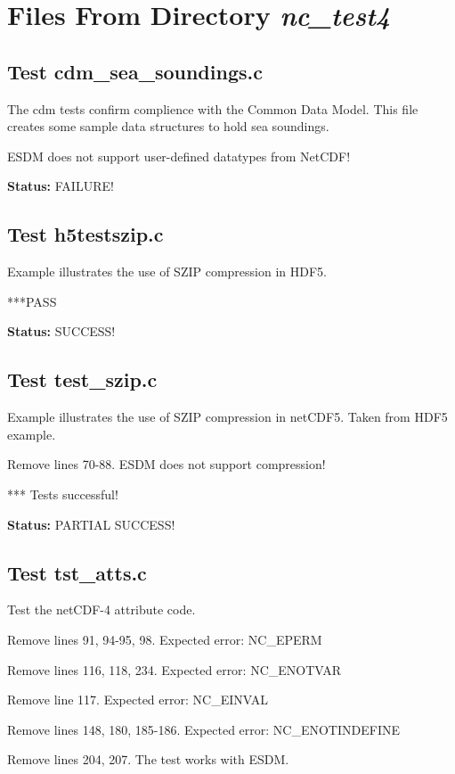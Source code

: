 \chapter{Files From Directory {\textit{nc\_test4}}}

\section{Test cdm\_sea\_soundings.c}

The cdm tests confirm complience with the Common Data Model. This
file creates some sample data structures to hold sea soundings.

ESDM does not support user-defined datatypes from NetCDF!

{\bf \large Status: } FAILURE!

\section{Test h5testszip.c}

Example illustrates the use of SZIP compression in HDF5.

***PASS

{\bf \large Status: } SUCCESS!

\section{Test test\_szip.c}

Example illustrates the use of SZIP compression in netCDF5.
Taken from HDF5 example.

Remove lines 70-88. ESDM does not support compression!

*** Tests successful!

{\bf \large Status: } PARTIAL SUCCESS!

\section{Test tst\_atts.c}

Test the netCDF-4 attribute code.

Remove lines 91, 94-95, 98. Expected error: NC\_EPERM

Remove lines 116, 118, 234. Expected error: NC\_ENOTVAR

Remove line 117. Expected error: NC\_EINVAL

Remove lines 148, 180, 185-186. Expected error: NC\_ENOTINDEFINE

Remove lines 204, 207. The test works with ESDM.

